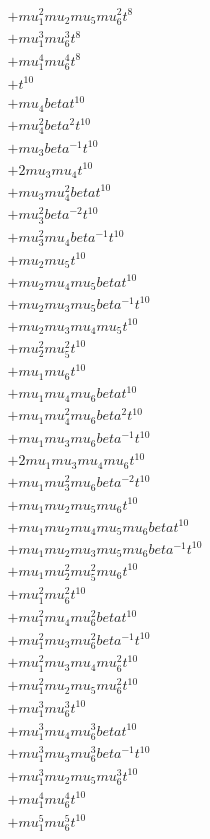 \begin{align*}
  + mu_1^{2} mu_2 mu_5 mu_6^{2} t^{8} \\
  + mu_1^{3} mu_6^{3} t^{8} \\
  + mu_1^{4} mu_6^{4} t^{8} \\
  + t^{10} \\
  + mu_4 beta t^{10} \\
  + mu_4^{2} beta^{2} t^{10} \\
  + mu_3 beta^{-1} t^{10} \\
  + 2 mu_3 mu_4 t^{10} \\
  + mu_3 mu_4^{2} beta t^{10} \\
  + mu_3^{2} beta^{-2} t^{10} \\
  + mu_3^{2} mu_4 beta^{-1} t^{10} \\
  + mu_2 mu_5 t^{10} \\
  + mu_2 mu_4 mu_5 beta t^{10} \\
  + mu_2 mu_3 mu_5 beta^{-1} t^{10} \\
  + mu_2 mu_3 mu_4 mu_5 t^{10} \\
  + mu_2^{2} mu_5^{2} t^{10} \\
  + mu_1 mu_6 t^{10} \\
  + mu_1 mu_4 mu_6 beta t^{10} \\
  + mu_1 mu_4^{2} mu_6 beta^{2} t^{10} \\
  + mu_1 mu_3 mu_6 beta^{-1} t^{10} \\
  + 2 mu_1 mu_3 mu_4 mu_6 t^{10} \\
  + mu_1 mu_3^{2} mu_6 beta^{-2} t^{10} \\
  + mu_1 mu_2 mu_5 mu_6 t^{10} \\
  + mu_1 mu_2 mu_4 mu_5 mu_6 beta t^{10} \\
  + mu_1 mu_2 mu_3 mu_5 mu_6 beta^{-1} t^{10} \\
  + mu_1 mu_2^{2} mu_5^{2} mu_6 t^{10} \\
  + mu_1^{2} mu_6^{2} t^{10} \\
  + mu_1^{2} mu_4 mu_6^{2} beta t^{10} \\
  + mu_1^{2} mu_3 mu_6^{2} beta^{-1} t^{10} \\
  + mu_1^{2} mu_3 mu_4 mu_6^{2} t^{10} \\
  + mu_1^{2} mu_2 mu_5 mu_6^{2} t^{10} \\
  + mu_1^{3} mu_6^{3} t^{10} \\
  + mu_1^{3} mu_4 mu_6^{3} beta t^{10} \\
  + mu_1^{3} mu_3 mu_6^{3} beta^{-1} t^{10} \\
  + mu_1^{3} mu_2 mu_5 mu_6^{3} t^{10} \\
  + mu_1^{4} mu_6^{4} t^{10} \\
  + mu_1^{5} mu_6^{5} t^{10}
\end{align*}
